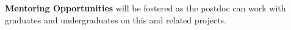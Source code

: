 \documentclass[11pt]{article}
\begin{document}
\medskip
\noindent \textbf{Mentoring Opportunities} will be fostered as the postdoc can
work with graduates and undergraduates on this and related projects.  



\end{document}
